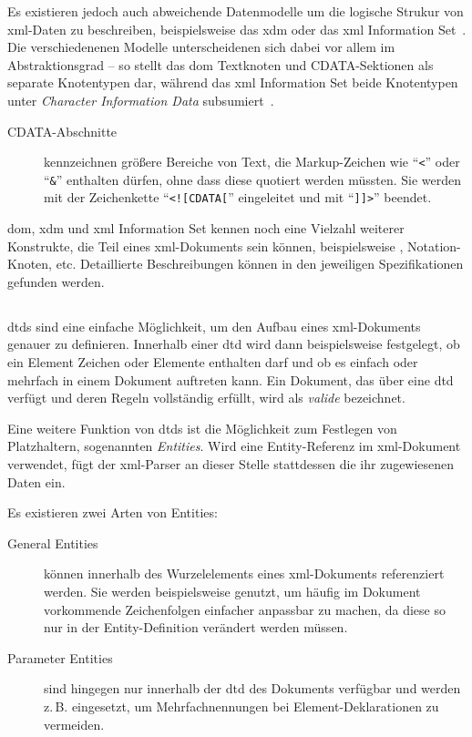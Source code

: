 Es existieren jedoch auch abweichende Datenmodelle um die logische Strukur von \acrshort{xml}-Daten zu beschreiben, beispielsweise das \acrfull{xdm} oder das \acrshort{xml} Information Set~\cite{xmlinfoset}. Die verschiedenenen Modelle unterscheidenen sich dabei vor allem im Abstraktionsgrad -- so stellt das \gls{dom} Textknoten und CDATA-Sektionen als separate Knotentypen dar, während das \acrshort{xml} Information Set beide Knotentypen unter \emph{Character Information Data} subsumiert~\cite[Abschnitt 2.6]{xmlinfoset}.

\begin{description}
    \item[CDATA-Abschnitte] kennzeichnen größere Bereiche von Text, die Markup-Zeichen wie \enquote{\texttt{<}} oder \enquote{\texttt{\&}} enthalten dürfen, ohne dass diese quotiert werden müssten. Sie werden mit der Zeichenkette \enquote{\texttt{<![CDATA[}} eingeleitet und mit \enquote{\texttt{]]>}} beendet.~\cite[Abschnitt 2.7]{xml}
\end{description}

\gls{dom}, \acrshort{xdm} und \acrshort{xml} Information Set kennen noch eine Vielzahl weiterer Konstrukte, die Teil eines \acrshort{xml}-Dokuments sein können, beispielsweise , Notation-Knoten, etc. Detaillierte Beschreibungen können in den jeweiligen Spezifikationen gefunden werden.~\cite{dom,xmlinfoset,xdm,xml}

\subsection{}

\glspl{dtd} sind eine einfache Möglichkeit, um den Aufbau eines \acrshort{xml}-Dokuments genauer zu definieren. Innerhalb einer \acrshort{dtd} wird dann beispielsweise festgelegt, ob ein Element Zeichen oder Elemente enthalten darf und ob es einfach oder mehrfach in einem Dokument auftreten kann. Ein Dokument, das über eine \gls{dtd} verfügt und deren Regeln vollständig erfüllt, wird als \emph{valide} bezeichnet.

Eine weitere Funktion von \glspl{dtd} ist die Möglichkeit zum Festlegen von Platzhaltern, sogenannten \emph{Entities}.  Wird eine Entity-Referenz im \acrshort{xml}-Dokument verwendet, fügt der \acrshort{xml}-Parser an dieser Stelle stattdessen die ihr zugewiesenen Daten ein.

\begin{samepage}
    Es existieren zwei Arten von Entities:
    \begin{description}
        \item[General Entities] können innerhalb des Wurzelelements eines \acrshort{xml}-Dokuments referenziert werden. Sie werden beispielsweise genutzt, um häufig im Dokument vorkommende Zeichenfolgen einfacher anpassbar zu machen, da diese so nur in der Entity-Definition verändert werden müssen.
        \item[Parameter Entities] sind hingegen nur innerhalb der \gls{dtd} des Dokuments verfügbar und werden z.\,B. eingesetzt, um Mehrfachnennungen bei Element-Deklarationen zu vermeiden.
    \end{description}
\end{samepage}

